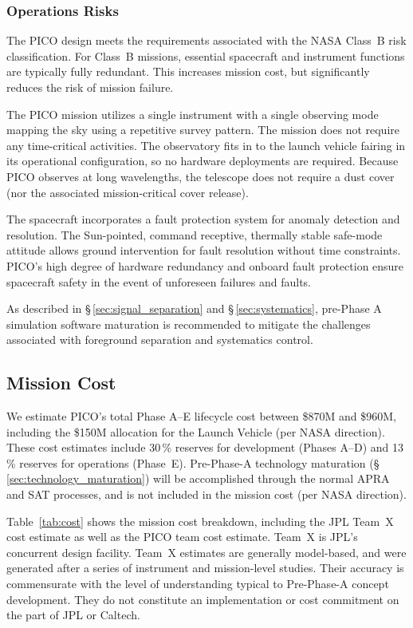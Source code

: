 \subsubsection{Operations Risks}
\label{sec:operations_risks} %

The PICO design meets the requirements associated with the NASA
Class~B risk classification. For Class~B missions, essential
spacecraft and instrument functions are typically fully
redundant. This increases mission cost, but significantly reduces the
risk of mission failure.

The PICO mission utilizes a single instrument with a single observing
mode mapping the sky using a repetitive survey pattern. The mission
does not require any time-critical activities. The observatory fits in
to the launch vehicle fairing in its operational configuration, so no
hardware deployments are required. Because PICO observes at long
wavelengths, the telescope does not require a dust cover (nor the
associated mission-critical cover release).

The spacecraft incorporates a fault protection system for anomaly
detection and resolution. The Sun-pointed, command receptive,
thermally stable safe-mode attitude allows ground intervention for
fault resolution without time constraints. PICO's high degree of
hardware redundancy and onboard fault protection ensure spacecraft
safety in the event of unforeseen failures and faults.

As described in \S\,\ref{sec:signal_separation} and
\S\,\ref{sec:systematics}, pre-Phase A simulation software maturation
is recommended to mitigate the challenges associated with foreground
separation and systematics control.

\subsection{Mission Cost}
\label{sec:mission_cost} %

We estimate PICO's total Phase A--E lifecycle cost between \$870M and
\$960M, including the \$150M allocation for the Launch Vehicle (per
NASA direction). These cost estimates include 30\,\% reserves for
development (Phases A--D) and 13\,\% reserves for operations
(Phase~E). Pre-Phase-A technology maturation
(\S\,\ref{sec:technology_maturation}) will be accomplished through the
normal APRA and SAT processes, and is not included in the mission cost
(per NASA direction).

Table~\ref{tab:cost} shows the mission cost breakdown, including the
JPL Team~X cost estimate as well as the PICO team cost estimate. Team~X
 is JPL's concurrent design facility. Team~X estimates are generally
model-based, and were generated after a series of instrument and
mission-level studies. Their accuracy is commensurate with the level
of understanding typical to Pre-Phase-A concept development. They do
not constitute an implementation or cost commitment on the part of JPL
or Caltech.

